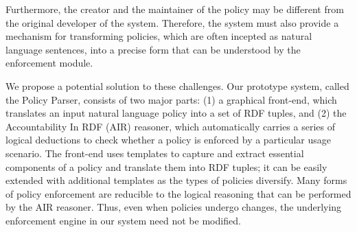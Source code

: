 \documentclass{llncs}
\begin{document}
Furthermore, the creator and the maintainer of the policy may be
different from the original developer of the system. Therefore, the
system must also provide a mechanism for transforming policies, 
which are often incepted as natural language sentences, into a precise
form that can be understood by the enforcement module.

We propose a potential solution to these challenges. Our prototype
system, called the Policy Parser, consists of two major parts:
(1) a graphical front-end, which translates an input natural language policy
into a set of RDF tuples, and (2) the Accountability In RDF (AIR)
reasoner, which automatically carries a series of logical
deductions to check whether a policy is enforced by a particular usage
scenario. The front-end uses templates to capture and extract
essential components of a policy and translate them into RDF tuples;
it can be easily extended with additional templates as the types of
policies diversify. Many forms of policy enforcement are
reducible to the logical reasoning that can be performed by the AIR
reasoner. Thus, even when policies undergo changes, the
underlying enforcement engine in our system need not be modified.


\end{document}
